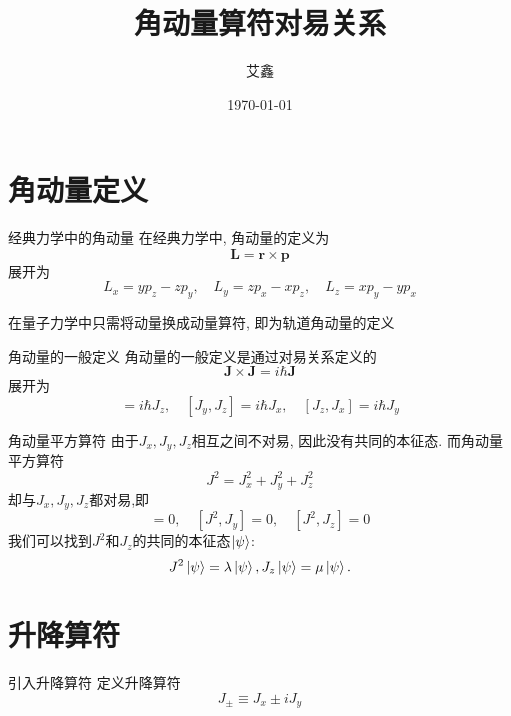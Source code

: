 \documentclass{beamer}
\title{角动量算符对易关系}
\author{艾鑫}
\institute[三峡大学]{三峡大学\hspace{1em}理学院}
\date{\today}
\begin{document}
\maketitle

\section{角动量定义}

\begin{frame}{经典力学中的角动量}
在经典力学中, 角动量的定义为
\begin{equation}
\bm{L} = \bm{r} \times \bm{p}
\end{equation}
展开为
\begin{equation}
L_x = yp_z - zp_y, \quad L_y = zp_x - xp_z, \quad L_z = xp_y - yp_x
\end{equation}

在量子力学中只需将动量换成动量算符, 即为轨道角动量的定义
\end{frame}

\begin{frame}{角动量的一般定义}
角动量的一般定义是通过对易关系定义的
\begin{equation}
\bm{J} \times \bm{J} = i \hbar \bm{J}
\end{equation}
展开为
\begin{equation}
[J_x, J_y] = i\hbar J_z , \quad [J_y, J_z] = i \hbar J_x , \quad [J_z, J_x] = i\hbar J_y
\end{equation}
\end{frame}

\begin{frame}{角动量平方算符}
由于$J_x, J_y, J_z$相互之间不对易, 因此没有共同的本征态. 而角动量平方算符
\begin{equation}
J^2 = J_x^2 + J_y^2 + J_z^2
\end{equation}
却与$J_x, J_y, J_z$都对易,即
\begin{equation}
[J^2,J_x] = 0, \quad [J^2, J_y] = 0, \quad [J^2, J_z] = 0
\end{equation}
我们可以找到$J^2$和$J_z$的共同的本征态$\ket{\psi}$:
\begin{equation}
J^2 \ket{\psi} = \lambda \ket{\psi}, J_z \ket{\psi} = \mu \ket{\psi}.
\end{equation}
\end{frame}

\section{升降算符}

\begin{frame}{引入升降算符}
定义升降算符
\begin{equation}
J_{\pm} \equiv J_x \pm i J_y
\end{equation}
\end{frame}
\end{document}
